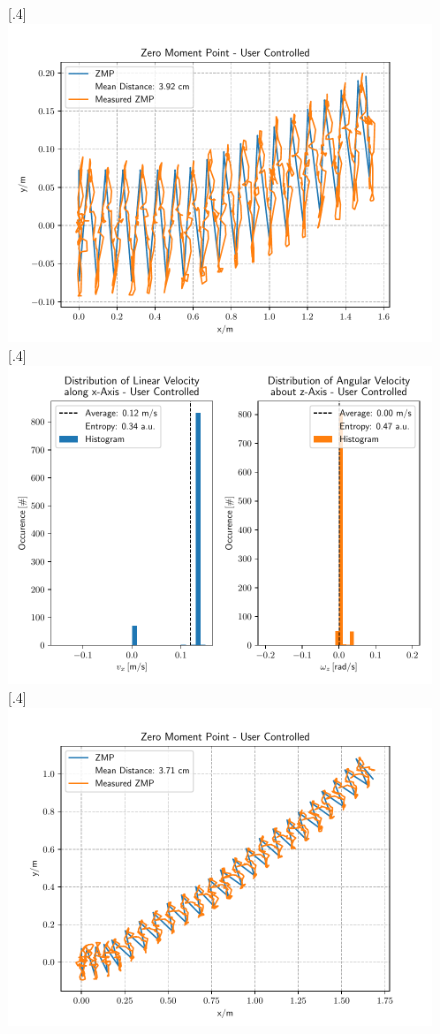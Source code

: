 \begin{figure}[h]
	\centering
	[.4\linewidth]{\includegraphics[scale=.35]{chapters/05_experiments/03_user_controlled_walking/straight_walk_01_zmp.pdf}}
	[.4\linewidth]{\includegraphics[scale=.35]{chapters/05_experiments/03_user_controlled_walking/straight_walk_01_entropy.pdf}}
	[.4\linewidth]{\includegraphics[scale=.35]{chapters/05_experiments/03_user_controlled_walking/curved_walk_01_zmp.pdf}}

\end{figure}
